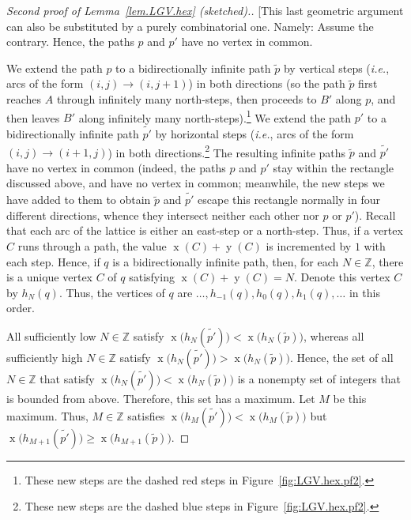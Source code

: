 \documentclass[reqno]{amsart}
\newcommand{\0}{\phantom{c}}
\DeclareMathOperator{\xcoord}{x} %
\DeclareMathOperator{\ycoord}{y} %
\newcommand{\ZZ}{\mathbb{Z}}
\newenvironment{verlong}{}{}
\theoremstyle{plain}
\theoremstyle{definition}
\numberwithin{equation}{section}
\begin{document}
\begin{verlong}
\begin{proof}[Second proof of Lemma~\ref{lem.LGV.hex} (sketched).]
[This last geometric argument can also be substituted by a purely combinatorial one.
Namely: Assume the contrary. Hence, the paths $p$ and $p'$ have no vertex in common.

We extend the path $p$ to a bidirectionally infinite path $\widetilde{p}$ by vertical steps (\textit{i.e.}, arcs of the form $(i,j) \to (i,j+1)$) in both directions (so the path $\widetilde{p}$ first reaches $A$ through infinitely many north-steps, then proceeds to $B'$ along $p$, and then leaves $B'$ along infinitely many north-steps).\footnote{These new steps are the dashed red steps in Figure~\ref{fig:LGV.hex.pf2}.}
We extend the path $p'$ to a bidirectionally infinite path $\widetilde{p'}$ by horizontal steps (\textit{i.e.}, arcs of the form $(i,j) \to (i+1,j)$) in both directions.\footnote{These new steps are the dashed blue steps in Figure~\ref{fig:LGV.hex.pf2}.}
The resulting infinite paths $\widetilde{p}$ and $\widetilde{p'}$ have no vertex in common (indeed, the paths $p$ and $p'$ stay within the rectangle discussed above, and have no vertex in common; meanwhile, the new
steps we have added to them to obtain $\widetilde{p}$ and $\widetilde{p'}$ escape this rectangle normally in four different directions, whence they intersect neither each other nor $p$ or $p'$).
Recall that each arc of the lattice is either an east-step or a north-step.
Thus, if a vertex $C$ runs through a path, the value $\xcoord(C) + \ycoord(C)$ is incremented by $1$ with each step.
Hence, if $q$ is a bidirectionally infinite path, then, for each $N \in \ZZ$, there is a unique vertex $C$ of $q$ satisfying $\xcoord(C) + \ycoord(C) = N$.
Denote this vertex $C$ by $h_N(q)$.
Thus, the vertices of $q$ are $\ldots, h_{-1}(q), h_{0}(q), h_1(q), \ldots$ in this order.

All sufficiently low $N \in \ZZ$ satisfy $\xcoord\bigl( h_N(\widetilde{p'}) \bigr) < \xcoord\bigl( h_N(\widetilde{p}) \bigr)$, whereas all sufficiently high $N \in \ZZ$ satisfy $\xcoord\bigl( h_N(\widetilde{p'}) \bigr) > \xcoord\bigl( h_N(\widetilde{p}) \bigr)$.
Hence, the set of all $N \in \ZZ$ that satisfy $\xcoord\bigl( h_N(\widetilde{p'}) \bigr) < \xcoord\bigl( h_N(\widetilde{p}) \bigr)$ is a nonempty set of integers that is bounded from above.
Therefore, this set has a maximum.
Let $M$ be this maximum.
Thus, $M \in \ZZ$ satisfies $\xcoord\bigl( h_{M}(\widetilde{p'}) \bigr) < \xcoord\bigl( h_{M}(\widetilde{p}) \bigr)$ but $\xcoord\bigl( h_{M+1}(\widetilde{p'}) \bigr) \geq \xcoord\bigl( h_{M+1}(\widetilde{p}) \bigr)$.


\end{proof}
\end{verlong}
\end{document}
